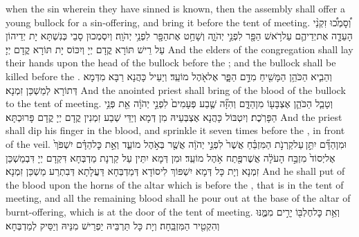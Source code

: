 {when the sin wherein they have sinned is known, then the assembly shall offer a young bullock for a sin-offering, and bring it before the tent of meeting.}{}
{וְ֠סָמְכ֠וּ זִקְנֵ֨י הָעֵדָ֧ה אֶת\maqqaf יְדֵיהֶ֛ם עַל\maqqaf רֹ֥אשׁ הַפָּ֖ר לִפְנֵ֣י יְהֹוָ֑ה וְשָׁחַ֥ט אֶת\maqqaf הַפָּ֖ר לִפְנֵ֥י יְהֹוָֽה׃}
{וְיִסְמְכוּן סָבֵי כְּנִשְׁתָּא יָת יְדֵיהוֹן עַל רֵישׁ תּוֹרָא קֳדָם יְיָ וְיִכּוֹס יָת תּוֹרָא קֳדָם יְיָ׃}
{And the elders of the congregation shall lay their hands upon the head of the bullock before the \lord; and the bullock shall be killed before the \lord.}{}
{וְהֵבִ֛יא הַכֹּהֵ֥ן הַמָּשִׁ֖יחַ מִדַּ֣ם הַפָּ֑ר אֶל\maqqaf אֹ֖הֶל מוֹעֵֽד׃}
{וְיַעֵיל כָּהֲנָא רַבָּא מִדְּמָא דְּתוֹרָא לְמַשְׁכַּן זִמְנָא׃}
{And the anointed priest shall bring of the blood of the bullock to the tent of meeting.}{}
{וְטָבַ֧ל הַכֹּהֵ֛ן אֶצְבָּע֖וֹ מִן\maqqaf הַדָּ֑ם וְהִזָּ֞ה שֶׁ֤בַע פְּעָמִים֙ לִפְנֵ֣י יְהֹוָ֔ה אֵ֖ת פְּנֵ֥י הַפָּרֹֽכֶת׃}
{וְיִטְבּוֹל כָּהֲנָא אֶצְבְּעֵיהּ מִן דְּמָא וְיַדֵּי שְׁבַע זִמְנִין קֳדָם יְיָ קֳדָם פָּרוּכְתָּא׃}
{And the priest shall dip his finger in the blood, and sprinkle it seven times before the \lord, in front of the veil.}{}
{וּמִן\maqqaf הַדָּ֞ם יִתֵּ֣ן \legarmeh  עַל\maqqaf קַרְנֹ֣ת הַמִּזְבֵּ֗חַ אֲשֶׁר֙ לִפְנֵ֣י יְהֹוָ֔ה אֲשֶׁ֖ר בְּאֹ֣הֶל מוֹעֵ֑ד וְאֵ֣ת כׇּל\maqqaf הַדָּ֗ם יִשְׁפֹּךְ֙ אֶל\maqqaf יְסוֹד֙ מִזְבַּ֣ח הָעֹלָ֔ה אֲשֶׁר\maqqaf פֶּ֖תַח אֹ֥הֶל מוֹעֵֽד׃}
{וּמִן דְּמָא יִתֵּין עַל קַרְנָת מַדְבְּחָא דִּקְדָם יְיָ דִּבְמַשְׁכַּן זִמְנָא וְיָת כָּל דְּמָא יִשְׁפּוֹךְ לִיסוֹדָא דְּמַדְבְּחָא דַּעֲלָתָא דְּבִתְרַע מַשְׁכַּן זִמְנָא׃}
{And he shall put of the blood upon the horns of the altar which is before the \lord, that is in the tent of meeting, and all the remaining blood shall he pour out at the base of the altar of burnt-offering, which is at the door of the tent of meeting.}{}
{וְאֵ֥ת כׇּל\maqqaf חֶלְבּ֖וֹ יָרִ֣ים מִמֶּ֑נּוּ וְהִקְטִ֖יר הַמִּזְבֵּֽחָה׃}
{וְיָת כָּל תַּרְבֵּיהּ יַפְרֵישׁ מִנֵּיהּ וְיַסֵּיק לְמַדְבְּחָא׃}
